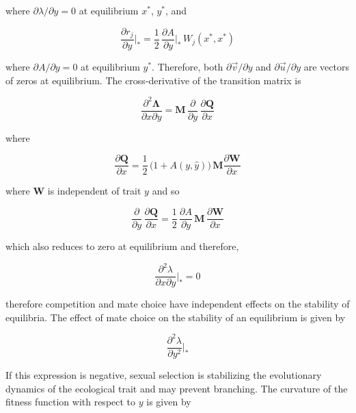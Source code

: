 where $\partial \lambda / \partial y = 0$ at equilibrium $x^*$, $y^*$, and

\begin{equation}
    \frac{\partial r_j}{\partial y}\bigg|_* = \frac{1}{2} \, \frac{\partial A}{\partial y}\bigg|_*\,W_j(x^*,x^*)
\end{equation}

where $\partial A / \partial y = 0$ at equilibrium $y^*$. Therefore, both $\partial \overrightarrow{v} / \partial y$ and $\partial \overrightarrow{u} / \partial y$ are vectors of zeros at equilibrium. The cross-derivative of the transition matrix is

\begin{equation}
    \frac{\partial^2 \pmb \Lambda}{\partial x \partial y} = \pmb M \, \frac{\partial}{\partial y}\,\frac{\partial \pmb Q}{\partial x}
\end{equation}

where 

\begin{equation}
    \frac{\partial \pmb Q}{\partial x} = \frac{1}{2}\,\big(1+A(y,\hat y)\big)\,\pmb M \frac{\partial \pmb W}{\partial x}
\end{equation}

where $\pmb W$ is independent of trait $y$ and so

\begin{equation}
    \frac{\partial}{\partial y}\,\frac{\partial \pmb Q}{\partial x} = \frac{1}{2}\,\frac{\partial A}{\partial y}\,\pmb M\,\frac{\partial \pmb W}{\partial x}
\end{equation}

which also reduces to zero at equilibrium and therefore, 

\begin{equation}
    \frac{\partial^2 \lambda}{\partial x \partial y}\bigg|_* = 0
\end{equation}

therefore competition and mate choice  have independent effects on the stability of equilibria. The effect of mate choice on the stability of an equilibrium is given by

\begin{equation}
    \frac{\partial^2 \lambda}{\partial y^2}\bigg|_*
\end{equation}

If this expression is negative, sexual selection is stabilizing the evolutionary dynamics of the ecological trait and may prevent branching. The curvature of the fitness function with respect to $y$ is given by

